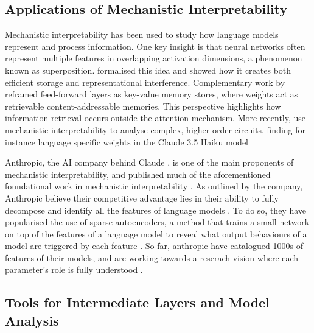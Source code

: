 
\subsection{Applications of Mechanistic Interpretability}

Mechanistic interpretability has been used to study how language models represent and process information. One key insight is that neural networks often represent multiple features in overlapping activation dimensions, a phenomenon known as superposition. \citet{elhage2022toy} formalised this idea and showed how it creates both efficient storage and representational interference. Complementary work by \citet{geva2021memory} reframed feed-forward layers as key-value memory stores, where weights act as retrievable content-addressable memories. This perspective highlights how information retrieval occurs outside the attention mechanism. More recently, \citet{lindsey2025biology} use mechanistic interpretability to analyse complex, higher-order circuits, finding for instance language specific weights in the Claude 3.5 Haiku model \citep{anthropic2024claude3}

Anthropic, the AI company behind Claude \citep{anthropic2024claude3}, is one of the main proponents of mechanistic interpretability, and published much of the aforementioned foundational work in mechanistic interpretability \citep{elhage2021mathematical, elhage2022toy, ameisen2025circuit}. As outlined by the company, Anthropic believe their competitive advantage lies in their ability to fully decompose and identify all the features of language models \citep{anthropic2023components}. To do so, they have popularised the use of sparse autoencoders, a method that trains a small network on top of the features of a language model to reveal what output behaviours of a model are triggered by each feature \citep{templeton2024scaling}. So far, anthropic have catalogued 1000s of features of their models, and are working towards a reserach vision where each parameter's role is fully understood \citep{anthropic2023components}.

\subsection{Tools for Intermediate Layers and Model Analysis}

